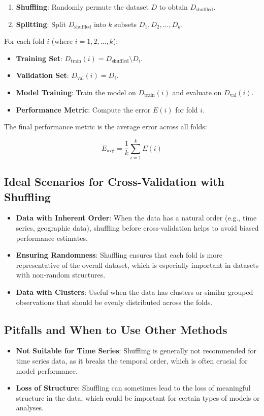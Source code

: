 \documentclass[10pt]{article}
\begin{document}
\begin{enumerate}
    \item \textbf{Shuffling}: Randomly permute the dataset \(D\) to obtain \(D_{\text{shuffled}}\).
    \item \textbf{Splitting}: Split \(D_{\text{shuffled}}\) into \(k\) subsets \(D_1, D_2, \dots, D_k\).
\end{enumerate}

For each fold \(i\) (where \(i=1,2,\dots,k\)):

\begin{itemize}
    \item \textbf{Training Set}: \(D_{\text{train}}(i) = D_{\text{shuffled}} \setminus D_i\).
    \item \textbf{Validation Set}: \(D_{\text{val}}(i) = D_i\).
    \item \textbf{Model Training}: Train the model on \(D_{\text{train}}(i)\) and evaluate on \(D_{\text{val}}(i)\).
    \item \textbf{Performance Metric}: Compute the error \(E(i)\) for fold \(i\).
\end{itemize}

The final performance metric is the average error across all folds:

\[
E_{\text{avg}} = \frac{1}{k} \sum_{i=1}^{k} E(i)
\]

\subsection{Ideal Scenarios for Cross-Validation with Shuffling}
\begin{itemize}
    \item \textbf{Data with Inherent Order}: When the data has a natural order (e.g., time series, geographic data), shuffling before cross-validation helps to avoid biased performance estimates.
    \item \textbf{Ensuring Randomness}: Shuffling ensures that each fold is more representative of the overall dataset, which is especially important in datasets with non-random structures.
    \item \textbf{Data with Clusters}: Useful when the data has clusters or similar grouped observations that should be evenly distributed across the folds.
\end{itemize}

\subsection{Pitfalls and When to Use Other Methods}
\begin{itemize}
    \item \textbf{Not Suitable for Time Series}: Shuffling is generally not recommended for time series data, as it breaks the temporal order, which is often crucial for model performance.
    \item \textbf{Loss of Structure}: Shuffling can sometimes lead to the loss of meaningful structure in the data, which could be important for certain types of models or analyses.
\end{itemize}
\end{document}
